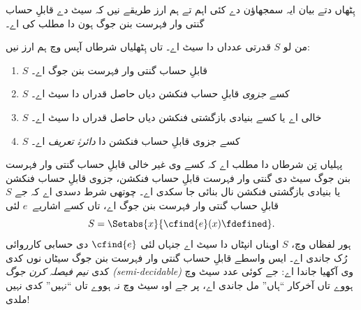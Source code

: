 \documentclass[../../../include/open-logic-section]{subfiles}
\begin{document}



ہِٹھاں دتے بیان ایہ سمجھاؤن دے کئی اہم تے ہم ارز
طریقے نیں کہ سیٹ دے قابلِ حساب گنتی وار فہرست
بنن جوگ ہون دا مطلب کی اے۔

\begin{thm}
من لو $S$ قدرتی عدداں دا سیٹ اے۔ تاں ہِٹھلیاں
شرطاں آپس وچ ہم ارز نیں:
\begin{enumerate}
\item{} $S$ قابلِ حساب گنتی وار فہرست بنن جوگ اے۔
\item{} $S$ کسے \emph{جزوی} قابلِ حساب فنکشن دیاں حاصل قدراں دا سیٹ اے۔
\item{} $S$ خالی اے یا کسے بنیادی بازگشتی فنکشن دیاں حاصل قدراں دا سیٹ اے۔
\item{} $S$ کسے جزوی قابلِ حساب فنکشن دا \emph{دائرۂ تعریف} اے۔
\end{enumerate}
\end{thm}

\begin{explain}
پہلیاں تِن شرطاں دا مطلب اے کہ کسے وی غیر خالی
قابلِ حساب گنتی وار فہرست بنن جوگ سیٹ دی گنتی وار
فہرست قابلِ حساب فنکشن، جزوی قابلِ حساب فنکشن یا
بنیادی بازگشتی فنکشن نال بنائی جا سکدی اے۔ چوتھی
شرط دسدی اے کہ جے $S$ قابلِ حساب گنتی وار فہرست
بنن جوگ اے، تاں کسے اشاریے~$e$ لئی
\[
S = \Setabs{x}{\cfind{e}(x) \fdefined}.
\]
ہور لفظاں وچ، $S$ اوہناں انپٹاں دا سیٹ اے جنہاں
لئی $\cfind{e}$ دی حسابی کارروائی رُک جاندی اے۔
ایس واسطے قابلِ حساب گنتی وار فہرست بنن جوگ سیٹاں
نوں کدی کدی \emph{نیم فیصلہ کرن جوگ
(semi-decidable)} وی آکھیا جاندا اے: جے کوئی عدد
سیٹ وچ ہووے تاں آخرکار ``ہاں'' مل جاندی اے، پر
جے اوہ سیٹ وچ نہ ہووے تاں ``نہیں'' کدی نہیں ملدی!{}
\end{explain}
\end{document}
